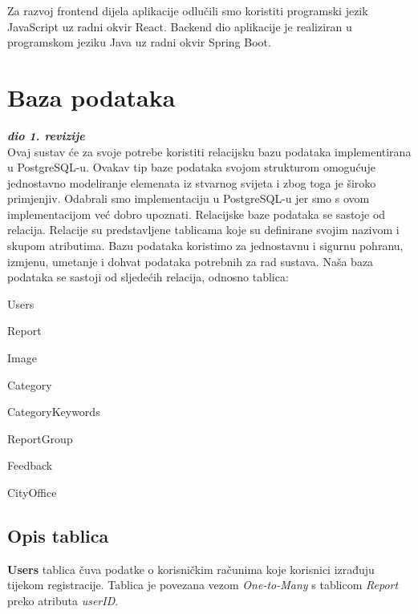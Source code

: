 		Za razvoj frontend dijela aplikacije odlučili smo koristiti programski jezik JavaScript uz radni okvir React. Backend dio aplikacije je realiziran u programskom jeziku Java uz radni okvir Spring Boot.
		
	\eject
	
		

		\section{Baza podataka}
			
		\textbf{\textit{dio 1. revizije}}\\
			
		Ovaj sustav će za svoje potrebe koristiti relacijsku bazu podataka implementirana u PostgreSQL-u. Ovakav tip baze podataka svojom strukturom omogućuje jednostavno modeliranje elemenata iz stvarnog svijeta i zbog toga je široko primjenjiv. Odabrali smo implementaciju u PostgreSQL-u jer smo s ovom implementacijom već dobro upoznati. Relacijske baze podataka se sastoje od relacija. Relacije su predstavljene tablicama koje su definirane svojim nazivom i skupom atributima. Bazu podataka koristimo za jednostavnu i sigurnu pohranu, izmjenu, umetanje i dohvat podataka potrebnih za rad sustava. Naša baza podataka se sastoji od sljedećih relacija, odnosno tablica:
		
		\begin{packed_item}
			\item Users
			\item Report
			\item Image
			\item Category
			\item CategoryKeywords
			\item ReportGroup 
			\item Feedback
			\item CityOffice
		\end{packed_item}
		
			\subsection{Opis tablica}
			
			\textbf{Users} tablica čuva podatke o korisničkim računima koje korisnici izrađuju tijekom registracije. Tablica je povezana vezom \textit{One-to-Many} s tablicom \textit{Report} preko atributa \textit{userID}.
			
